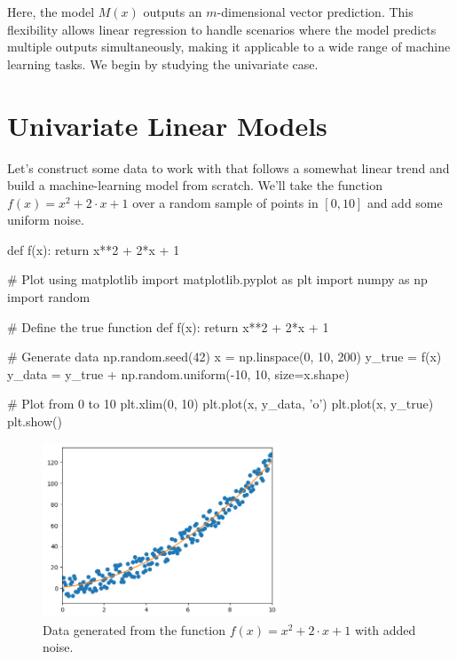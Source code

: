 Here, the model $M(x)$ outputs an $m$-dimensional vector prediction. This flexibility allows linear regression to handle scenarios where the model predicts multiple outputs simultaneously, making it applicable to a wide range of machine learning tasks. We begin by studying the univariate case.

\section{Univariate Linear Models}
\label{sec:2}
Let's construct some data to work with that follows a somewhat linear trend and build a machine-learning model from scratch. We'll take the function $f(x)=x^2+2\cdot x+1$ over a random sample of points in $[0,10]$ and add some uniform noise.


\begin{codeblock}
def f(x):
    return x**2 + 2*x + 1

# Plot using matplotlib
import matplotlib.pyplot as plt
import numpy as np
import random

# Define the true function
def f(x):
    return x**2 + 2*x + 1

# Generate data
np.random.seed(42)
x = np.linspace(0, 10, 200)
y_true = f(x)
y_data = y_true + np.random.uniform(-10, 10, size=x.shape)

# Plot from 0 to 10
plt.xlim(0, 10)
plt.plot(x, y_data, 'o')
plt.plot(x, y_true)
plt.show()
\end{codeblock}

\begin{figure}[H]
\centering
\includegraphics[width=200pt]{Regression/img/output_2_0.png}
\caption{Data generated from the function $f(x)=x^2+2\cdot x+1$ with added noise.}
\label{fig:linear1}
\end{figure}

